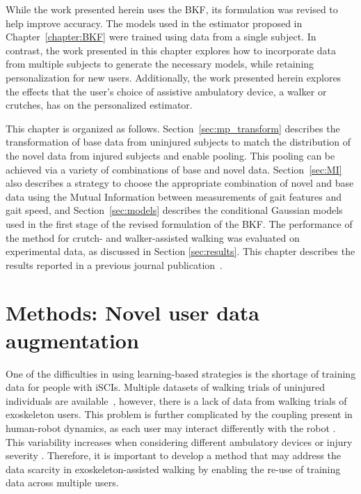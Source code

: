 While the work presented herein uses the BKF, its formulation was revised to help improve accuracy. The models used in the estimator proposed in Chapter~\ref{chapter:BKF} were trained using data from a single subject. In contrast, the work presented in this chapter explores how to incorporate data from multiple subjects to generate the necessary models, while retaining personalization for new users. Additionally, the work presented herein explores the effects that the user's choice of assistive ambulatory device, a walker or crutches, has on the personalized estimator.

This chapter is organized as follows. Section~\ref{sec:mp_transform} describes the transformation of base data from uninjured subjects to match the distribution of the novel data from injured subjects and enable pooling. This pooling can be achieved via a variety of combinations of base and novel data. Section~\ref{sec:MI} also describes a strategy to choose the appropriate combination of novel and base data using the Mutual Information between measurements of gait features and gait speed, and Section~\ref{sec:models} describes the conditional Gaussian models used in the first stage of the revised formulation of the BKF. The performance of the method for crutch- and walker-assisted walking was evaluated on experimental data, as discussed in Section \ref{sec:results}. This chapter describes the results reported in a previous journal publication~\cite{karulkar2022personalized}.

\section{Methods: Novel user data augmentation}

One of the difficulties in using learning-based strategies is the shortage of training data for people with iSCIs. Multiple datasets of walking trials of uninjured individuals are available~\cite{hu2018benchmark,anguita2013public,fukuchi2018public}, however, there is a lack of data from walking trials of exoskeleton users. This problem is further complicated by the coupling present in human-robot dynamics, as each user may interact differently with the robot \cite{sylla2014assessing}. This variability increases when considering different ambulatory devices \cite{gambon2019characterizing} or injury severity \cite{gambon2020effects, rota2011walk}. Therefore, it is important to develop a method that may address the data scarcity in exoskeleton-assisted walking by enabling the re-use of training data across multiple users.

